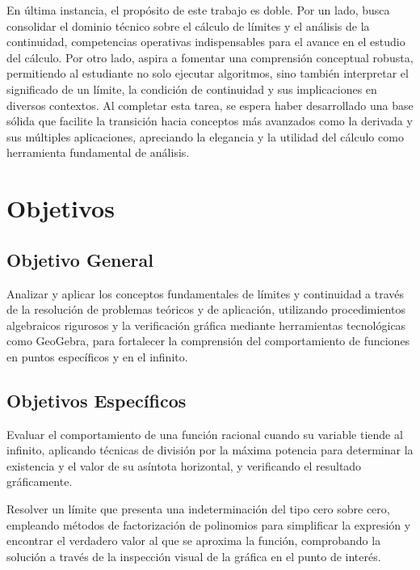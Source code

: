 \documentclass{article}
\begin{document}
En última instancia, el propósito de este trabajo es doble. Por un lado, busca consolidar el dominio técnico sobre el cálculo de límites y el análisis de la continuidad, competencias operativas indispensables para el avance en el estudio del cálculo. Por otro lado, aspira a fomentar una comprensión conceptual robusta, permitiendo al estudiante no solo ejecutar algoritmos, sino también interpretar el significado de un límite, la condición de continuidad y sus implicaciones en diversos contextos. Al completar esta tarea, se espera haber desarrollado una base sólida que facilite la transición hacia conceptos más avanzados como la derivada y sus múltiples aplicaciones, apreciando la elegancia y la utilidad del cálculo como herramienta fundamental de análisis.

\newpage

\section*{Objetivos}

\subsection*{Objetivo General}

Analizar y aplicar los conceptos fundamentales de límites y continuidad a través de la resolución de problemas teóricos y de aplicación, utilizando procedimientos algebraicos rigurosos y la verificación gráfica mediante herramientas tecnológicas como GeoGebra, para fortalecer la comprensión del comportamiento de funciones en puntos específicos y en el infinito.

\subsection*{Objetivos Específicos}

Evaluar el comportamiento de una función racional cuando su variable tiende al infinito, aplicando técnicas de división por la máxima potencia para determinar la existencia y el valor de su asíntota horizontal, y verificando el resultado gráficamente.

Resolver un límite que presenta una indeterminación del tipo cero sobre cero, empleando métodos de factorización de polinomios para simplificar la expresión y encontrar el verdadero valor al que se aproxima la función, comprobando la solución a través de la inspección visual de la gráfica en el punto de interés.
\end{document}
